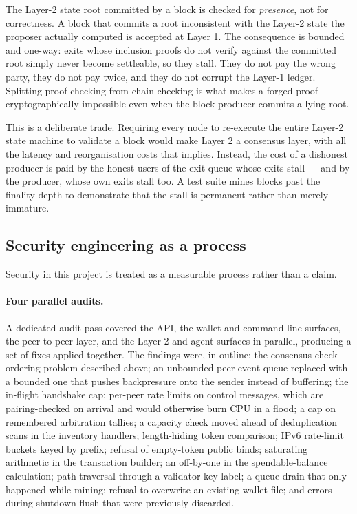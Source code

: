 \documentclass{article}
\begin{document}
The Layer-2 state root committed by a block is checked for \emph{presence},
not for correctness. A block that commits a root inconsistent with the
Layer-2 state the proposer actually computed is accepted at Layer 1. The
consequence is bounded and one-way: exits whose inclusion proofs do not verify
against the committed root simply never become settleable, so they stall.
They do not pay the wrong party, they do not pay twice, and they do not corrupt
the Layer-1 ledger. Splitting proof-checking from chain-checking is what makes
a forged proof cryptographically impossible even when the block producer
commits a lying root.

This is a deliberate trade. Requiring every node to re-execute the entire
Layer-2 state machine to validate a block would make Layer 2 a consensus
layer, with all the latency and reorganisation costs that implies. Instead, the
cost of a dishonest producer is paid by the honest users of the exit queue
whose exits stall --- and by the producer, whose own exits stall too. A test
suite mines blocks past the finality depth to demonstrate that the stall is
permanent rather than merely immature.

\subsection{Security engineering as a process}
\label{sec:security-process}

Security in this project is treated as a measurable process rather than a
claim.

\paragraph{Four parallel audits.} A dedicated audit pass covered the API, the
wallet and command-line surfaces, the peer-to-peer layer, and the Layer-2 and
agent surfaces in parallel, producing a set of fixes applied together. The
findings were, in outline: the consensus check-ordering problem described
above; an unbounded peer-event queue replaced with a bounded one that pushes
backpressure onto the sender instead of buffering; the in-flight handshake cap;
per-peer rate limits on control messages, which are pairing-checked on arrival
and would otherwise burn CPU in a flood; a cap on remembered arbitration
tallies; a capacity check moved ahead of deduplication scans in the inventory
handlers; length-hiding token comparison; IPv6 rate-limit buckets keyed by
prefix; refusal of empty-token public binds; saturating arithmetic in the
transaction builder; an off-by-one in the spendable-balance calculation; path
traversal through a validator key label; a queue drain that only happened while
mining; refusal to overwrite an existing wallet file; and errors during
shutdown flush that were previously discarded.
\end{document}
